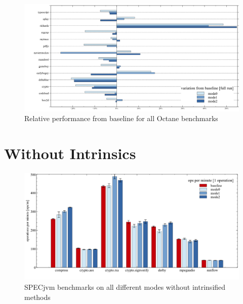 \begin{figure}[ht]
  \begin{center}
    \centering
    \includegraphics[width=1.0\textwidth]{figures/octane_variation.png}
    \caption{Relative performance from baseline for all Octane benchmarks}
    \label{f:octane_variation}
  \end{center}
\end{figure}


\section{Without Intrinsics}
\label{s:without_intrinsics}

\begin{figure}[ht]
  \begin{center}
    \centering
    \includegraphics[width=1.0\textwidth]{figures/others_warmup_nointrinsics.png}
    \caption{SPECjvm benchmarks on all different modes without intrinsified methods}
    \label{f:others_warmup_nointrinsics}
  \end{center}
\end{figure}

